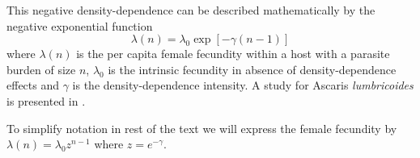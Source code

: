 \documentclass[12pt,a4paper]{article}
\theoremstyle{plain}%
\theoremstyle{definition}
\theoremstyle{remark}
\begin{document}
This negative density-dependence can be described mathematically by the negative exponential function
\begin{equation}
\lambda(n)=\lambda_0\exp[-\gamma(n-1)]
\end{equation} 
where $\lambda(n)$ is the per capita female fecundity within a host with a parasite burden of size $n$,
$\lambda_0$ is the intrinsic fecundity in absence of density-dependence effects and 
$\gamma$ is the density-dependence intensity. 
A study for Ascaris \textit{lumbricoides} is presented in \citep{hall2000geographical}.

To simplify notation in rest of the text we will express the female fecundity by $\lambda(n)=\lambda_0 z^{n-1}$ where $z=e^{-\gamma}$.
\end{document}
